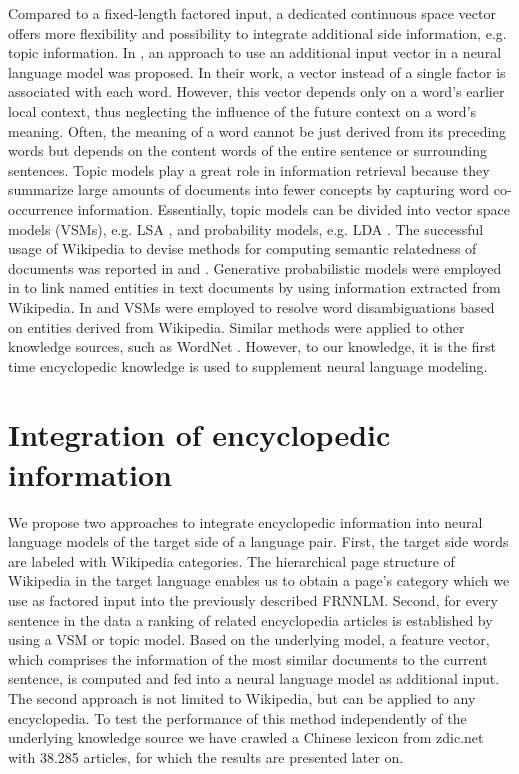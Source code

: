\documentclass[a4paper]{article}
\begin{document}
Compared to a fixed-length factored input, a dedicated continuous space vector offers more flexibility and possibility to integrate additional side information, e.g. topic information. In \cite{mikolov2012context}, an approach to use an additional input vector in a neural language model was proposed. In their work, a vector instead of a single factor is associated with each word. However, this vector depends only on a word's earlier local context, thus neglecting the influence of the future context on a word's meaning. 
Often, the meaning of a word cannot be just derived from its preceding words but depends on the content words of the entire sentence or surrounding sentences. 
Topic models play a great role in information retrieval because they summarize large amounts of documents into fewer concepts by capturing word co-occurrence information. Essentially, topic models can be divided into vector space models (VSMs), e.g. LSA \cite{deerwester1990indexing}, and probability models, e.g. LDA \cite{blei2003latent}. 
The successful usage of Wikipedia to devise methods for computing semantic relatedness of documents was reported in \cite{gabrilovich2007computing} and \cite{strube2006wikirelate}.
Generative probabilistic models were employed in \cite{han2012entity} to link named entities in text documents by using information extracted from Wikipedia. 
In \cite{cucerzan2007large} and \cite{bunescu2006using} VSMs were employed to resolve word disambiguations based on entities derived from Wikipedia.
Similar methods were applied to other knowledge sources, such as WordNet \cite{hearst1992automatic}.
However, to our knowledge, it is the first time encyclopedic knowledge is used to supplement neural language modeling.

\section{Integration of encyclopedic information}
We propose two approaches to integrate encyclopedic information into neural language models of the target side of a language pair.
First, the target side words are labeled with Wikipedia categories. The hierarchical page structure of Wikipedia in the target language enables us to obtain a page's category which we use as factored input into the previously described FRNNLM.
Second, for every sentence in the data a ranking of related encyclopedia articles is established by using a VSM or topic model. Based on the underlying model, a feature vector, which comprises the information of the most similar documents to the current sentence, is computed  and fed into a neural language model as additional input. The second approach is not limited to Wikipedia, but can be applied to any encyclopedia. To test the performance of this method independently of the underlying knowledge source we have crawled a Chinese lexicon from zdic.net \cite{zdic} with 38.285 articles, for which the results are presented later on. 
\end{document}
